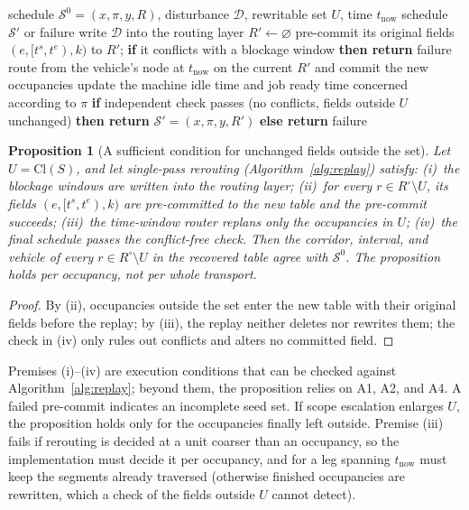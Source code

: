 \documentclass[manuscript,screen,review]{acmart}
\newtheorem{prop}{Proposition}
\begin{document}
\begin{algorithm}[t]
\caption{Single-pass rerouting \(\textsc{ReplayReroute}\)}
\label{alg:replay}
\begin{algorithmic}[1]
\Require schedule \(\mathcal{S}^0=(x,\pi,y,R)\), disturbance \(\mathcal{D}\), rewritable set \(U\), time \(t_{\mathrm{now}}\)
\Ensure schedule \(\mathcal{S}'\) or failure
\State write \(\mathcal{D}\) into the routing layer 
\State \(R'\gets\varnothing\)
  \State pre-commit its original fields \((e,[t^s,t^e),k)\) to \(R'\); \textbf{if} it conflicts with a blockage window \textbf{then return} failure
\EndFor
{}
  \State route from the vehicle's node at \(t_{\mathrm{now}}\) on the current \(R'\) and commit the new occupancies
  \State update the machine idle time and job ready time concerned according to \(\pi\)
\EndFor
\State \textbf{if} independent check passes (no conflicts, fields outside \(U\) unchanged) \textbf{then return} \(\mathcal{S}'=(x,\pi,y,R')\) \textbf{else return} failure
\end{algorithmic}
\end{algorithm}

\begin{prop}[A sufficient condition for unchanged fields outside the set]
\label{prop:outside}
Let \(U=\mathrm{Cl}(S)\), and let single-pass rerouting (Algorithm~\ref{alg:replay}) satisfy:
(i)~the blockage windows are written into the routing layer; (ii)~for every \(r\in R^{\circ}\setminus U\), its fields \((e,[t^s,t^e),k)\) are pre-committed to the new table and the pre-commit succeeds;
(iii)~the time-window router replans only the occupancies in \(U\); (iv)~the final schedule passes the conflict-free check.
Then the corridor, interval, and vehicle of every \(r\in R^{\circ}\setminus U\) in the recovered table agree with \(\mathcal{S}^0\).
The proposition holds per occupancy, not per whole transport.
\end{prop}

\begin{proof}
By (ii), occupancies outside the set enter the new table with their original fields before the replay; by (iii), the replay neither deletes nor rewrites them; the check in (iv) only rules out conflicts and alters no committed field.
\end{proof}

Premises (i)--(iv) are execution conditions that can be checked against Algorithm~\ref{alg:replay}; beyond them, the proposition relies on A1, A2, and A4.
A failed pre-commit indicates an incomplete seed set. If scope escalation enlarges \(U\), the proposition holds only for the occupancies finally left outside.
Premise (iii) fails if rerouting is decided at a unit coarser than an occupancy, so the implementation must decide it per occupancy, and for a leg spanning \(t_{\mathrm{now}}\) must keep the segments already traversed (otherwise finished occupancies are rewritten, which a check of the fields outside \(U\) cannot detect).
\end{document}
